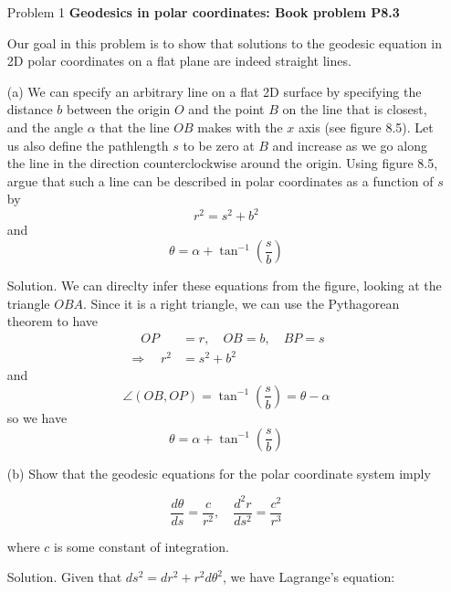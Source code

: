 \documentclass[12pt]{article}
\begin{document}
\begin{enumerate}
  \item[Problem 1] \textbf{Geodesics in polar coordinates: Book problem P8.3}
  
  Our goal in this problem is to show that solutions to the geodesic equation in 2D polar coordinates on a flat plane are indeed straight lines.
  \item[(a)] We can specify an arbitrary line on a flat 2D surface by specifying the distance $b$ between the origin $O$ and the point $B$ on the line that is closest, and the angle $\alpha$ that the line $O B$ makes with the $x$ axis (see figure 8.5). Let us also define the pathlength $s$ to be zero at $B$ and increase as we go along the line in the direction counterclockwise around the origin. Using figure 8.5, argue that such a line can be described in polar coordinates as a function of $s$ by
  $$
  r^2=s^2+b^2
  $$
  and
  $$
  \theta=\alpha+\tan ^{-1}\left(\frac{s}{b}\right)
  $$

  \item[Solution.]
  We can direclty infer these equations from the figure, looking at the triangle $O B A$. Since it is a right triangle, we can use the Pythagorean theorem to have
  $$
  \begin{aligned} \quad O P & =r, \quad O B=b, \quad B P=s \\ \Rightarrow \quad r^2 & =s^2+b^2\end{aligned}
  $$
  and 
  $$
  \angle(O B, O P)=\tan ^{-1}\left(\frac{s}{b}\right)=\theta-\alpha
  $$
  so we have
  $$
  \theta = \alpha + \tan^{-1}\left(\frac{s}{b}\right)
  $$


  \item[(b)] Show that the geodesic equations for the polar coordinate system imply

  $$
  \frac{d \theta}{d s}=\frac{c}{r^2}, \quad \frac{d^2 r}{d s^2}=\frac{c^2}{r^3}
  $$

  where $c$ is some constant of integration.

  \item[Solution.]
  Given that $ds^2 = dr^2 + r^2 d\theta^2$, we have Lagrange's equation:


\end{enumerate}
\end{document}

